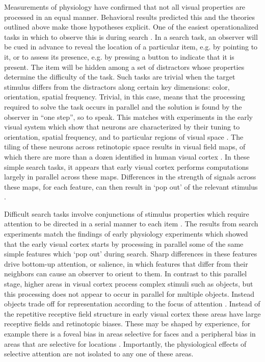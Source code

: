 Measurements of physiology have confirmed that not all visual properties are processed in an equal manner. Behavioral results predicted this \citep{Li2002-ji,Moray1959-fn} and the theories outlined above make those hypotheses explicit. One of the easiest operationalized tasks in which to observe this is during search \citep{Wolfe1994-ew}. In a search task, an observer will be cued in advance to reveal the location of a particular item, e.g. by pointing to it, or to assess its presence, e.g. by pressing a button to indicate that it is present. The item will be hidden among a set of distractors whose properties determine the difficulty of the task. Such tasks are trivial when the target stimulus differs from the distractors along certain key dimensions: color, orientation, spatial frequency. Trivial, in this case, means that the processing required to solve the task occurs in parallel and the solution is found by the observer in “one step”, so to speak. This matches with experiments in the early visual system which show that neurons are characterized by their tuning to orientation, spatial frequency, and to particular regions of visual space \citep{Barlow1957-by,Hubel1962-pn}. The tiling of these neurons across retinotopic space results in visual field maps, of which there are more than a dozen identified in human visual cortex \citep{Wade2002-tt,Wandell2007-pr,Wandell2011-td}. In these simple search tasks, it appears that early visual cortex performs computations largely in parallel across these maps. Differences in the strength of signals across these maps, for each feature, can then result in ‘pop out’ of the relevant stimulus \citep{Nothdurft1993-xt,Treisman1985-dr}. 

Difficult search tasks involve conjunctions of stimulus properties \citep{Egeth1984-ch} which require attention to be directed in a serial manner to each item \citep{Treisman1980-gu}. The results from search experiments match the findings of early physiology experiments \citep{Hubel1959-fo,Hubel1968-na} which showed that the early visual cortex starts by processing in parallel some of the same simple features which `pop out' during search. Sharp differences in these features drive bottom-up attention, or salience, in which features that differ from their neighbors can cause an observer to orient to them. In contrast to this parallel stage, higher areas in visual cortex process complex stimuli such as objects, but this processing does not appear to occur in parallel for multiple objects. Instead objects trade off for representation according to the focus of attention \citep{Desimone1998-wf}. Instead of the repetitive receptive field structure in early visual cortex these areas have large receptive fields and retinotopic biases. These may be shaped by experience, for example there is a foveal bias in areas selective for faces and a peripheral bias in areas that are selective for locations \citep{Levy2001-oe}. Importantly, the physiological effects of selective attention are not isolated to any one of these areas. 

